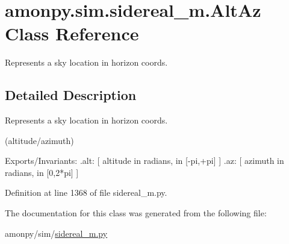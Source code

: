 \hypertarget{classamonpy_1_1sim_1_1sidereal__m_1_1_alt_az}{\section{amonpy.\-sim.\-sidereal\-\_\-m.\-Alt\-Az Class Reference}
\label{classamonpy_1_1sim_1_1sidereal__m_1_1_alt_az}
}


Represents a sky location in horizon coords.  




\subsection{Detailed Description}
Represents a sky location in horizon coords. 

(altitude/azimuth) \begin{DoxyVerb}  Exports/Invariants:
    .alt:   [ altitude in radians, in [-pi,+pi] ]
    .az:    [ azimuth in radians, in [0,2*pi] ]\end{DoxyVerb}
 

Definition at line 1368 of file sidereal\-\_\-m.\-py.



The documentation for this class was generated from the following file\-:\begin{DoxyCompactItemize}
\item 
amonpy/sim/\hyperlink{sidereal__m_8py}{sidereal\-\_\-m.\-py}\end{DoxyCompactItemize}

